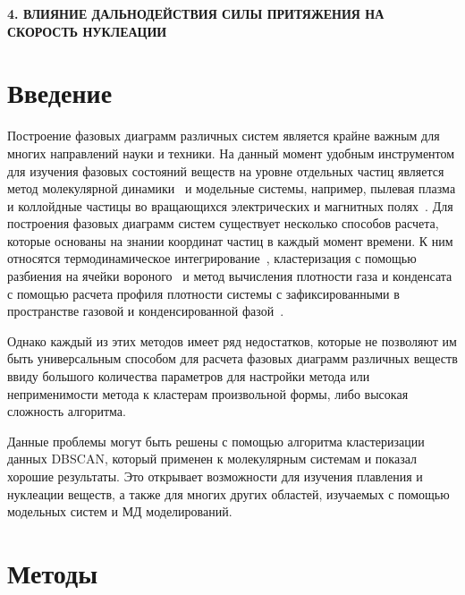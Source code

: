 
\begin{center}
\textbf{\large 4. ВЛИЯНИЕ ДАЛЬНОДЕЙСТВИЯ СИЛЫ ПРИТЯЖЕНИЯ НА СКОРОСТЬ НУКЛЕАЦИИ}
\end{center}

\section{Введение}
\label{PRIMe-SecIntroduction}

Построение фазовых диаграмм различных систем является крайне важным для многих направлений науки и техники.
На данный момент удобным инструментом для изучения фазовых состояний веществ на уровне отдельных частиц является метод молекулярной динамики~\cite{10.1063/1.1730376, 10.1006/jcph.1995.1039} и модельные системы, например, пылевая плазма и коллойдные частицы во вращающихся электрических и магнитных полях~\cite{10.1038/s41598-017-14001-y, 10.1103/physreve.103.022608, 10.1103/physreve.96.043201}.
Для построения фазовых диаграмм систем существует несколько способов расчета, которые основаны на знании координат частиц в каждый момент времени.
К ним относятся термодинамическое интегрирование~\cite{10.1088/0953-8984/21/46/465104}, кластеризация с помощью разбиения на ячейки вороного~\cite{10.1021/acs.jpcc.7b09317} и метод вычисления плотности газа и конденсата с помощью расчета профиля плотности системы с зафиксированными в пространстве газовой и конденсированной фазой~\cite{10.1021/jp806127j, 10.1021/jp1117213}.

Однако каждый из этих методов имеет ряд недостатков, которые не позволяют им быть универсальным способом для расчета фазовых диаграмм различных веществ ввиду большого количества параметров для настройки метода или неприменимости метода к кластерам произвольной формы, либо высокая сложность алгоритма.

Данные проблемы могут быть решены с помощью алгоритма кластеризации данных DBSCAN, который применен к молекулярным системам и показал хорошие результаты.
Это открывает возможности для изучения плавления и нуклеации веществ, а также для многих других областей, изучаемых с помощью модельных систем и МД моделирований.


\section{Методы}
\label{PRIMe-SecMethods}

